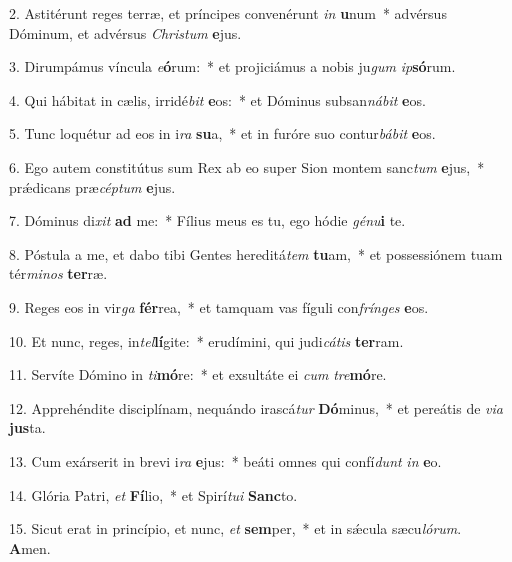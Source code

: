2. Astitérunt reges terræ, et príncipes convenérunt \textit{in} \textbf{u}num~*  advérsus Dóminum, et advérsus \textit{Chris}\textit{tum} \textbf{e}jus.\

3. Dirumpámus víncula \textit{e}\textbf{ó}rum:~*  et projiciámus a nobis ju\textit{gum} \textit{ip}\textbf{só}rum.\

4. Qui hábitat in cælis, irridé\textit{bit} \textbf{e}os:~*  et Dóminus subsan\textit{ná}\textit{bit} \textbf{e}os.\

5. Tunc loquétur ad eos in i\textit{ra} \textbf{su}a,~*  et in furóre suo contur\textit{bá}\textit{bit} \textbf{e}os.\

6. Ego autem constitútus sum Rex ab eo super Sion montem sanc\textit{tum} \textbf{e}jus,~*  prǽdicans præ\textit{cép}\textit{tum} \textbf{e}jus.\

7. Dóminus di\textit{xit} \textbf{ad} me:~*  Fílius meus es tu, ego hódie \textit{gé}\textit{nu}\textbf{i} te.\

8. Póstula a me, et dabo tibi Gentes hereditá\textit{tem} \textbf{tu}am,~*  et possessiónem tuam tér\textit{mi}\textit{nos} \textbf{ter}ræ.\

9. Reges eos in vir\textit{ga} \textbf{fér}rea,~*  et tamquam vas fíguli con\textit{frín}\textit{ges} \textbf{e}os.\

10. Et nunc, reges, in\textit{tel}\textbf{lí}gite:~*  erudímini, qui judi\textit{cá}\textit{tis} \textbf{ter}ram.\

11. Servíte Dómino in \textit{ti}\textbf{mó}re:~*  et exsultáte ei \textit{cum} \textit{tre}\textbf{mó}re.\

12. Apprehéndite disciplínam, nequándo irascá\textit{tur} \textbf{Dó}minus,~*  et pereátis de \textit{vi}\textit{a} \textbf{jus}ta.\

13. Cum exárserit in brevi i\textit{ra} \textbf{e}jus:~*  beáti omnes qui confí\textit{dunt} \textit{in} \textbf{e}o.\

14. Glória Patri, \textit{et} \textbf{Fí}lio,~*  et Spirí\textit{tu}\textit{i} \textbf{Sanc}to.\

15. Sicut erat in princípio, et nunc, \textit{et} \textbf{sem}per,~*  et in sǽcula sæcu\textit{ló}\textit{rum}. \textbf{A}men.\

